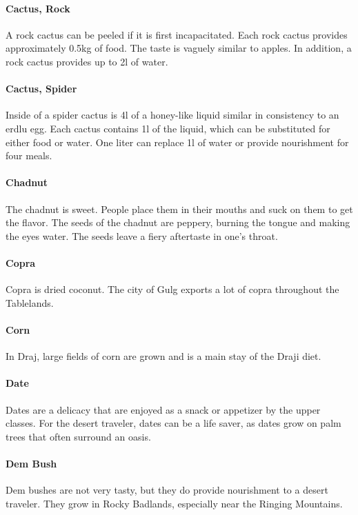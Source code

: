 \begin{multicols}{2}
\paragraph{Cactus, Rock} A rock cactus can be peeled if it is first incapacitated. Each rock cactus provides approximately 0.5kg of food. The taste is vaguely similar to apples. In addition, a rock cactus provides up to 2l of water.\\
\paragraph{Cactus, Spider} Inside of a spider cactus is 4l of a honey-like liquid similar in consistency to an erdlu egg. Each cactus contains 1l of the liquid, which can be substituted for either food or water. One liter can replace 1l of water or provide nourishment for four meals.\\
\paragraph{Chadnut} The chadnut is sweet. People place them in their mouths and suck on them to get the flavor. The seeds of the chadnut are peppery, burning the tongue and making the eyes water. The seeds leave a fiery aftertaste in one's throat.\\
\paragraph{Copra} Copra is dried coconut. The city of Gulg exports a lot of copra throughout the Tablelands.\\
\paragraph{Corn} In Draj, large fields of corn are grown and is a main stay of the Draji diet.\\
\paragraph{Date} Dates are a delicacy that are enjoyed as a snack or appetizer by the upper classes. For the desert traveler, dates can be a life saver, as dates grow on palm trees that often surround an oasis.\\
\paragraph{Dem Bush} Dem bushes are not very tasty, but they do provide nourishment to a desert traveler. They grow in Rocky Badlands, especially near the Ringing Mountains.\\

\end{multicols}
